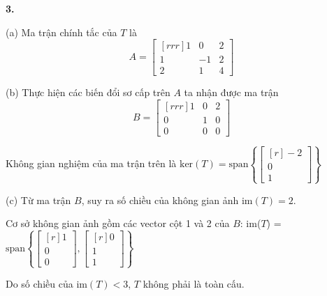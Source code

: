 \documentclass{article}
\begin{document}
    \begin{minipage}[t]{0.45\linewidth}
    \textbf{3.}

    (a) Ma trận chính tắc của $T$ là 
    \[A = \begin{bmatrix}[rrr]
        1 & 0 & 2 \\
        1 & -1 & 2 \\
        2 & 1 &  4 
    \end{bmatrix} \]

    (b) Thực hiện các biến đổi sơ cấp trên $A$ ta nhận được ma trận 
    \[ B = \begin{bmatrix}[rrr]
        1 & 0 & 2 \\
        0 & 1 & 0 \\
        0 & 0 & 0 
    \end{bmatrix} \]

    Không gian nghiệm của ma trận trên là $ \text{ker}(T) = \text{span} \left\{ \begin{bmatrix}[r]
        -2 \\
        0 \\
        1 
    \end{bmatrix}  \right\}$

    (c) Từ ma trận $B$, suy ra số chiều của không gian ảnh $\text{im}(T) = 2$.

    Cơ sở không gian ảnh gồm các vector cột 1 và 2 của $B$: im($T$) = $\text{span} \left\{ \begin{bmatrix}[r]
            1 \\ 0 \\ 0 
    \end{bmatrix} , \begin{bmatrix}[r]
    0  \\ 1 \\ 1 
    \end{bmatrix}  \right\}$

    Do số chiều của $\text{im}(T) < 3$, $T$ không phải là toàn cấu.

        
    \end{minipage} \hfill
\end{document}
